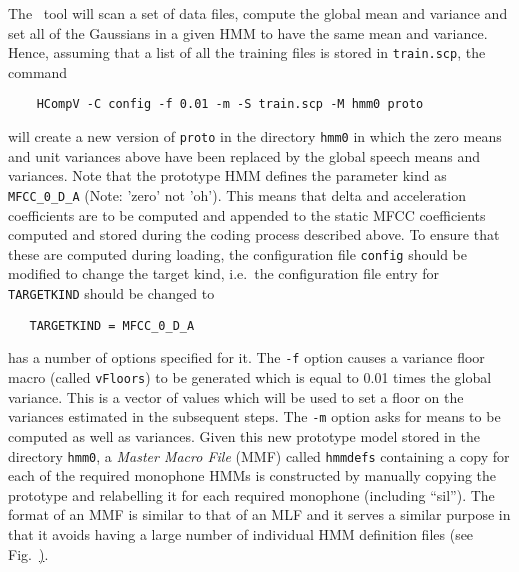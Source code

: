 The \HTK\ tool  will scan a set of data files, compute
the global mean and variance and set all of the Gaussians in a given HMM
to have the same mean and variance.
Hence, assuming that a list of all the training files is stored in
\texttt{train.scp}, the command
\begin{verbatim}
    HCompV -C config -f 0.01 -m -S train.scp -M hmm0 proto
\end{verbatim}
will create a new version of \texttt{proto} in the directory \texttt{hmm0}
in which the zero means and unit variances above have been replaced
by the global speech means and variances.
Note that the prototype HMM defines the parameter kind as \texttt{MFCC\_0\_D\_A} (Note: 'zero' not 'oh').
This means that delta and acceleration coefficients are to be computed and
appended to the static MFCC coefficients computed and stored during the
coding process described above.  To ensure that these are computed during loading,
the configuration file \texttt{config} should be modified
to change the target kind, i.e.\ the configuration file entry for
\texttt{TARGETKIND} should be changed to
\begin{verbatim}
   TARGETKIND = MFCC_0_D_A
\end{verbatim}
 has a number of options specified for it.  The 
\texttt{-f} option causes a variance floor 
macro (called \texttt{vFloors}) to be generated which
is equal to 0.01 times the global variance.  This is a vector
of values which will be used to set a floor on the variances estimated
in the subsequent steps.  The \texttt{-m} option asks for means to be computed
as well as variances.  Given this
new prototype model stored in the directory
\texttt{hmm0}, a \textit{Master Macro File} 
(MMF) called \texttt{hmmdefs} 
containing a copy for each of the required monophone HMMs is constructed 
by manually copying the prototype and relabelling it for each required 
monophone (including ``sil'').  
The format of an MMF is similar to that
of an MLF and it serves a similar purpose in that it avoids having
a large number of individual HMM definition files 
(see Fig.~\href{f:MMFeg}).


